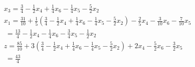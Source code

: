 \documentclass [a4paper,11pt]{article}
\begin{document}
\begin{enumerate}
\begin{align*}
            & x_3 = \frac{3}{4} - \frac{1}{2}x_4 + \frac{1}{4}x_6 - \frac{1}{4}x_5 - \frac{5}{2}x_2\\
            & x_1 = \frac{31}{10} + \frac{1}{5} \left( \frac{3}{4} - \frac{1}{2}x_4 + \frac{1}{4}x_6 - \frac{1}{4}x_5 - \frac{5}{2}x_2 \right) - \frac{2}{5}x_4 - \frac{3}{10}x_6 - \frac{7}{10}x_5\\
            &   \ = \frac{13}{4} - \frac{1}{2}x_4 - \frac{1}{4}x_6 - \frac{3}{4}x_5 - \frac{1}{2}x_2\\
            &   z = \frac{85}{10} + 3\left( \frac{3}{4} - \frac{1}{2}x_4 + \frac{1}{4}x_6 - \frac{1}{4}x_5 - \frac{5}{2}x_2 \right) + 2x_4 - \frac{5}{2}x_6 - \frac{3}{2}x_5\\
            &   \ = \frac{43}{4}
            \end{align*}

    \end{enumerate}
\end{document}
